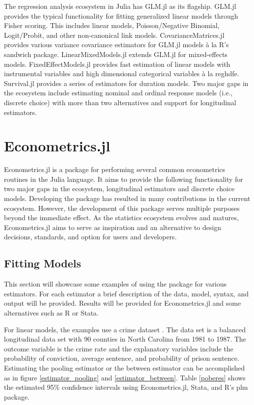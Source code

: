 \documentclass{juliacon}
\begin{document}
The regression analysis ecosystem in Julia has GLM.jl as its flagship. GLM.jl provides the typical functionality for fitting generalized linear models through Fisher scoring. This includes linear models, Poisson/Negative Binomial, Logit/Probit, and other non-canonical link models. CovarianceMatrices.jl provides various variance covariance estimators for GLM.jl models à la R's
sandwich package. LinearMixedModels.jl \cite{LinearMixedModels} extends GLM.jl for mixed-effects models. FixedEffectModels.jl provides fast estimation of linear models with instrumental variables and high dimensional categorical variables à la reghdfe. Survival.jl provides a series of estimators for duration models. Two major gaps in the ecosystem include estimating nominal and ordinal response models (i.e., discrete choice) with more than two alternatives and support for longitudinal estimators.

\section{Econometrics.jl}

Econometrics.jl is a package for performing several common econometrics routines in the Julia language. It aims to provide the following functionality for two major gaps in the ecosystem, longitudinal estimators and discrete choice models. Developing the package has resulted in many contributions in the current ecosystem. However, the development of this package serves multiple purposes beyond the immediate effect. As the statistics ecosystem evolves and matures, Econometrics.jl aims to serve as inspiration and an alternative to design decisions, standards, and option for users and developers.

\subsection{Fitting Models}

This section will showcase some examples of using the package for various estimators. For each estimator a brief description of the data, model, syntax, and output will be provided. Results will be provided for Econometrics.jl and some alternatives such as R or Stata.

For linear models, the examples use a crime dataset \cite{Crime}. The data set is a balanced longitudinal data set with 90 counties in North Carolina from 1981 to 1987. The outcome variable is the crime rate and the explanatory variables include the probability of conviction, average sentence, and probability of prison sentence. Estimating the pooling estimator or the between estimator can be accomplished as in figure \vref{estimator_pooling} and \vref{estimator_between}. Table \vref{poberes} shows the estimated 95\% confidence intervals using Econometrics.jl, Stata, and R's plm package.
\end{document}
